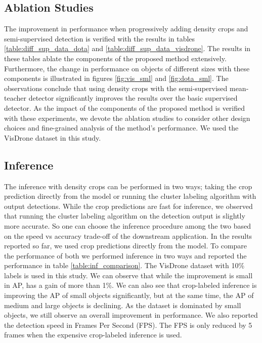 \subsection{Ablation Studies}
The improvement in performance when progressively adding density crops and semi-supervised detection is verified with the results in tables \ref{table:diff_sup_data_dota} and \ref{table:diff_sup_data_visdrone}. The results in these tables ablate the components of the proposed method extensively. Furthermore, the change in performance on objects of different sizes with these components is illustrated in figures \ref{fig:vis_sml} and \ref{fig:dota_sml}. The observations conclude that using density crops with the semi-supervised mean-teacher detector significantly improves the results over the basic supervised detector. As the impact of the components of the proposed method is verified with these experiments, we devote the ablation studies to consider other design choices and fine-grained analysis of the method's performance. We used the VisDrone dataset in this study.

\subsection{Inference}
The inference with density crops can be performed in two ways; taking the crop prediction directly from the model or running the cluster labeling algorithm with output detections. While the crop predictions are fast for inference, we observed that running the cluster labeling algorithm on the detection output is slightly more accurate. So one can choose the inference procedure among the two based on the speed vs accuracy trade-off of the downstream application. In the results reported so far, we used crop predictions directly from the model. To compare the performance of both we performed inference in two ways and reported the performance in table \ref{table:inf_comparison}. The VisDrone dataset with 10\% labels is used in this study. We can observe that while the improvement is small in AP,  has a gain of more than 1\%. We can also see that crop-labeled inference is improving the AP of small objects significantly, but at the same time, the AP of medium and large objects is declining. As the dataset is dominated by small objects, we still observe an overall improvement in performance. We also reported the detection speed in Frames Per Second (FPS). The FPS is only reduced by 5 frames when the expensive crop-labeled inference is used.


